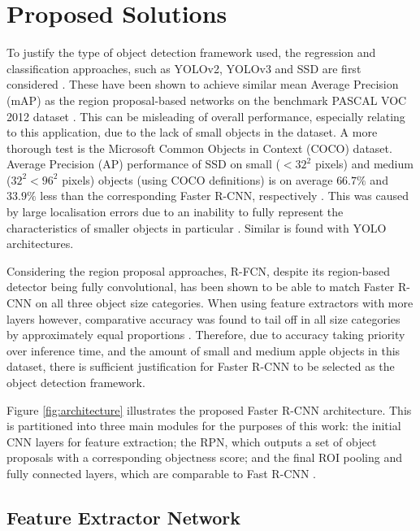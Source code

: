 \documentclass[journal]{IEEEtran}
\begin{document}
\section{Proposed Solutions}\label{proposedsolutions}

To justify the type of object detection framework used, the regression and classification approaches, such as YOLOv2, YOLOv3 and SSD are first considered \cite{yolov2,yolov3NEW,ssd}. These have been shown to achieve similar mean Average Precision (mAP) as the region proposal-based networks on the benchmark PASCAL VOC 2012 dataset \cite{mobilenet}. This can be misleading of overall performance, especially relating to this application, due to the lack of small objects in the dataset. A more thorough test is the Microsoft Common Objects in Context (COCO) dataset. Average Precision (AP) performance of SSD on small ($<32^2$ pixels) and medium ($32^2<96^2$ pixels) objects (using COCO definitions) is on average $66.7\%$ and $33.9\%$ less than the corresponding Faster R-CNN, respectively \cite{comparisonpaper}. This was caused by large localisation errors due to an inability to fully represent the characteristics of smaller objects in particular \cite{smallobjectdetection}. Similar is found with YOLO architectures.

Considering the region proposal approaches, R-FCN, despite its region-based detector being fully convolutional, has been shown to be able to match Faster R-CNN on all three object size categories. When using feature extractors with more layers however, comparative accuracy was found to tail off in all size categories by approximately equal proportions \cite{comparisonpaper}.
Therefore, due to accuracy taking priority over inference time, and the amount of small and medium apple objects in this dataset, there is sufficient justification for Faster R-CNN to be selected as the object detection framework. 

Figure \ref{fig:architecture} illustrates the proposed Faster R-CNN architecture. This is partitioned into three main modules for the purposes of this work: the initial CNN layers for feature extraction; the RPN, which outputs a set of object proposals with a corresponding objectness score; and the final ROI pooling and fully connected layers, which are comparable to Fast R-CNN \cite{fastrcnn}.




\subsection{Feature Extractor Network}
\end{document}
